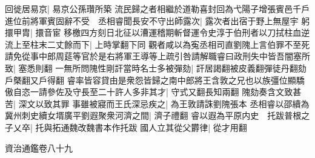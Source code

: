 回徙居易京|{
	易京公孫瓚所築}
流民歸之者相繼於道勒喜封回為弋陽子增張賓邑千戶進位前將軍賓固辭不受　丞相睿聞長安不守出師露次|{
	露次者出宿于野上無屋宇}
躬擐甲胄|{
	擐音宦}
移檄四方刻日北征以漕運稽期斬督運令史淳于伯刑者以刀拭柱血逆流上至柱末二丈餘而下|{
	上時掌翻下同}
觀者咸以為寃丞相司直劉隗上言伯罪不至死請免從事中郎周莚等官於是右將軍王導等上疏引咎請解職睿曰政刑失中皆吾闇塞所致|{
	塞悉則翻}
一無所問隗性剛訐當時名士多被彈劾|{
	訐居謁翻被皮義翻彈徒丹翻劾戶槩翻又戶得翻}
睿率皆容貸由是衆怨皆歸之南中郎將王含敦之兄也以族彊位顯驕傲自恣一請參佐及守長至二十許人多非其才|{
	守式又翻長知兩翻}
隗劾奏含文致甚苦|{
	深文以致其罪}
事雖被寢而王氏深忌疾之|{
	為王敦請誅劉隗張本}
丞相睿以邵續為冀州刺史續女壻廣平劉遐聚衆河濟之間|{
	濟子禮翻}
睿以遐為平原内史　托跋普根之子乂卒|{
	托與拓通魏改魏書本作托跋}
國人立其從父欝律|{
	從才用翻}


資治通鑑卷八十九
















































































